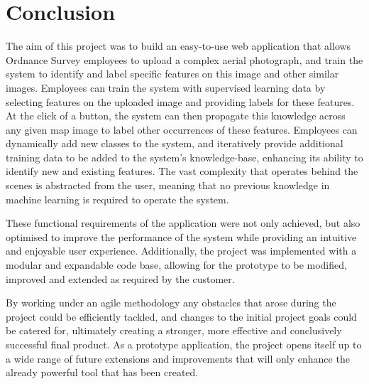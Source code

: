 \chapter{Conclusion} 
\label{chapter:conclusion}
The aim of this project was to build an easy-to-use web application that allows Ordnance Survey employees to upload a complex aerial photograph, and train the system to identify and label specific features on this image and other similar images. Employees can train the system with supervised learning data by selecting features on the uploaded image and providing labels for these features. At the click of a button, the system can then propagate this knowledge across any given map image to label other occurrences of these features. Employees can dynamically add new classes to the system, and iteratively provide additional training data to be added to the system’s knowledge-base, enhancing its ability to identify new and existing features. The vast complexity that operates behind the scenes is abstracted from the user, meaning that no previous knowledge in machine learning is required to operate the system. 

These functional requirements of the application were not only achieved, but also optimised to improve the performance of the system while providing an intuitive and enjoyable user experience. Additionally, the project was implemented with a modular and expandable code base, allowing for the prototype to be modified, improved and extended as required by the customer. 

By working under an agile methodology any obstacles that arose during the project could be efficiently tackled, and changes to the initial project goals could be catered for, ultimately creating a stronger, more effective and conclusively successful final product. As a prototype application, the project opens itself up to a wide range of future extensions and improvements that will only enhance the already powerful tool that has been created.